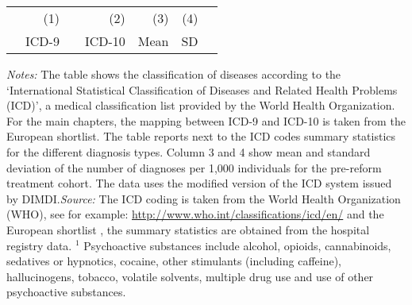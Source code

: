 \begin{landscape}
\begin{table}[h]
\begin{threeparttable}
			\begin{tabular}{lrrrrrr} %
				\toprule %
				&\multicolumn{1}{r}{(1)}& &\multicolumn{1}{r}{(2)}&\multicolumn{1}{r}{(3)} &\multicolumn{1}{r}{(4)}\\
				&\multicolumn{1}{r}{ICD-9} & & \multicolumn{1}{r}{ICD-10}&\multicolumn{1}{r}{Mean}&\multicolumn{1}{r}{SD} \\ 
				\midrule
				
				\bottomrule %
			\end{tabular}
			\begin{tablenotes}
				\scriptsize{ \item \textit{Notes:} The table shows the classification of diseases according to the `International Statistical Classification of Diseases and Related Health Problems (ICD)', a medical classification list provided by the World Health Organization. For the main chapters, the mapping between ICD-9 and ICD-10 is taken from the European shortlist. The table reports next to the ICD codes summary statistics for the different diagnosis types. Column 3 and 4 show mean and standard deviation of the number of diagnoses per 1,000 individuals for the pre-reform treatment cohort. The data uses the modified version of the ICD system issued by DIMDI.\newline \textit{Source:} The ICD coding is taken from the World Health Organization (WHO), see for example: \href{http://www.who.int/classifications/icd/en/}{http://www.who.int/classifications/icd/en/} and the European shortlist \citep[p. 76]{statistisches2012diagnosedaten}, the summary statistics are obtained from the hospital registry data. \newline\hspace*{15 pt}$^1$ Psychoactive substances include alcohol, opioids, cannabinoids, sedatives or hypnotics, cocaine, other stimulants (including caffeine), hallucinogens, tobacco, volatile solvents, multiple drug use and use of other psychoactive substances. }
			\end{tablenotes}
		\end{threeparttable}
	\end{table}
	\vspace*{\fill}\clearpage 
\end{landscape}
\restoregeometry



